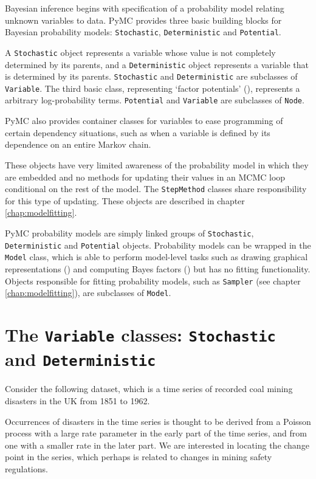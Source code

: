 
Bayesian inference begins with specification of a probability model relating unknown variables to data. PyMC provides three basic building blocks for Bayesian probability models: \texttt{Stochastic}, \texttt{Deterministic} and \texttt{Potential}. 

A \texttt{Stochastic} object represents a variable whose value is not completely determined by its parents, and a \texttt{Deterministic} object represents a variable that is determined by its parents. \texttt{Stochastic} and \texttt{Deterministic} are subclasses of \texttt{Variable}. The third basic class, representing `factor potentials' (\cite{dawidmarkov,jordangraphical}), represents a arbitrary log-probability terms. \texttt{Potential} and \texttt{Variable} are subclasses of \texttt{Node}.

PyMC also provides container classes for variables to ease programming of certain dependency situations, such as when a variable is defined by its dependence on an entire Markov chain.

\medskip
These objects have very limited awareness of the probability model in which they are embedded and no methods for updating their values in an MCMC loop conditional on the rest of the model. The \texttt{StepMethod} classes share responsibility for this type of updating. These objects are described in chapter \ref{chap:modelfitting}. 

\medskip
PyMC probability models are simply linked groups of \texttt{Stochastic}, \texttt{Deterministic} and \texttt{Potential} objects. Probability models can be wrapped in the \texttt{Model} class, which is able to perform model-level tasks such as drawing graphical representations (\cite{dawidmarkov,jordangraphical}) and computing Bayes factors (\cite{gelman}) but has no fitting functionality. Objects responsible for fitting probability models, such as \texttt{Sampler} (see chapter \ref{chap:modelfitting}), are subclasses of \texttt{Model}.

\section{The \texttt{Variable} classes: \texttt{Stochastic} and \texttt{Deterministic}}
Consider the following dataset, which is a time series of recorded coal mining disasters in the UK from 1851 to 1962.
\begin{center}
\end{center}
Occurrences of disasters in the time series is thought to be derived from a Poisson process with a large rate parameter in the early part of the time series, and from one with a smaller rate in the later part. We are interested in locating the change point in the series, which perhaps is related to changes in mining safety regulations.

